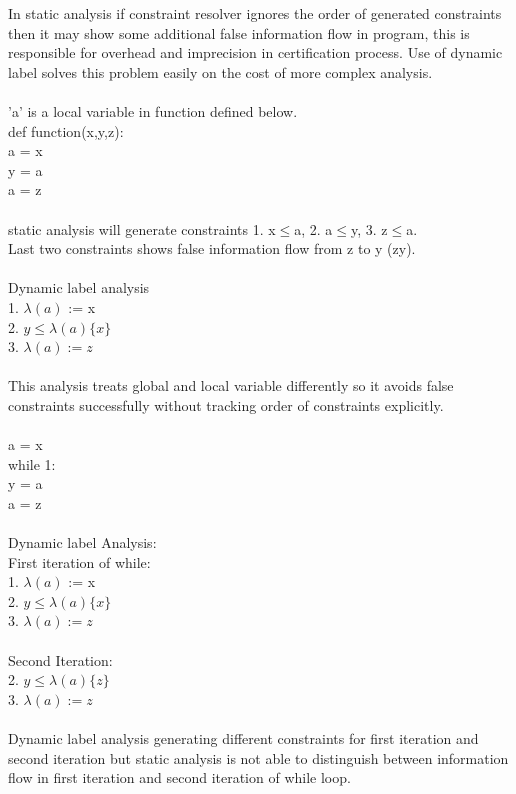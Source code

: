 In static analysis if constraint resolver ignores the order of generated constraints then it may show some additional false information flow in program, this is responsible for overhead and imprecision in certification process.
Use of dynamic label solves this problem easily on the cost of more complex analysis.\\~\\
'a' is a local variable in function defined below.\\
def function(x,y,z):\\
\hspace*{1cm}a = x\\
\hspace*{1cm}y = a\\
\hspace*{1cm}a = z\\~\\
static analysis will generate constraints 1. x$\le$a, 2. a$\le$y, 3. z$\le$a.\\
Last two constraints shows false information flow from z to y (z\marr y).\\~\\
Dynamic label analysis\\
1. $\lambda(a)$ := x\\
2. $y\le \lambda(a) \{x\}$\\
3. $\lambda(a) := z $\\~\\
This analysis treats global and local variable differently so it avoids false constraints successfully without tracking order of constraints explicitly.\\~\\
a = x\\
while 1:\\
\hspace*{1cm} y = a\\
\hspace*{1cm} a = z\\~\\
Dynamic label Analysis:\\
First iteration of while:\\
1. $\lambda(a)$ := x\\
2. $y\le \lambda(a) \{x\}$\\
3. $\lambda(a) := z $\\~\\
Second Iteration:\\
2. $y\le \lambda(a) \{z\}$\\
3. $\lambda(a) := z $\\~\\
Dynamic label analysis generating different constraints for first iteration and second iteration but static analysis is not able to distinguish between information flow in first iteration and second iteration of while loop.
